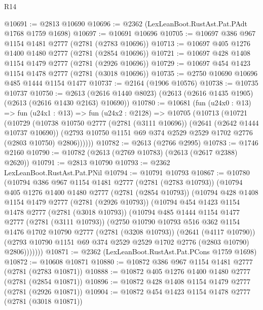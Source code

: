 \begin{lexlean}{R14}
\begin{coremodule}
@10691 := @2813 @10690
@10696 := @2362 (LexLeanBoot.RustAst.Pat.PAdt @1768 @1759 @1698)
@10697 := @10691 @10696
@10705 := @10697 @386 @967 @1154 @1481 @2777 (@2781 (@2783 @10696))
@10713 := @10697 @405 @1276 @1400 @1480 @2777 (@2781 (@2854 @10696))
@10721 := @10697 @428 @1408 @1154 @1479 @2777 (@2781 (@2926 @10696))
@10729 := @10697 @454 @1423 @1154 @1478 @2777 (@2781 (@3018 @10696))
@10735 := @2750 @10690 @10696 @485 @1444 @1154 @1477
@10737 := @2164 (@1906 @10576)
@10738 := @10735 @10737
@10750 := @2613 (@2616 @1440 @8023) (@2613 (@2616 @1435 @1905) (@2613 (@2616 @1430 @2163) @10690))
@10780 := @10681
    (fun (u24x0 : @13) =>
    fun (u24x1 : @13) =>
    fun (u24x2 : @2128) =>
    @10705
      (@10713
        (@10721
          (@10729
            (@10738
              @10750
              @2777
              (@2781 (@3111 @10696))
              (@2641 (@2642 @1444 @10737 @10690))
              (@2793 @10750 @1151 @69 @374 @2529 @2529 @1702 @2776 (@2803 @10750) @2806))))))
@10782 := @2613 (@2766 @2995)
@10783 := @1746 @2160
@10790 := @10782 (@2613 (@2769 @10783) (@2613 (@2617 @2388) @2620))
@10791 := @2813 @10790
@10793 := @2362 LexLeanBoot.RustAst.Pat.PNil
@10794 := @10791 @10793
@10867 := @10780
    (@10794
      @386
      @967
      @1154
      @1481
      @2777
      (@2781 (@2783 @10793))
      (@10794
        @405
        @1276
        @1400
        @1480
        @2777
        (@2781 (@2854 @10793))
        (@10794
          @428
          @1408
          @1154
          @1479
          @2777
          (@2781 (@2926 @10793))
          (@10794
            @454
            @1423
            @1154
            @1478
            @2777
            (@2781 (@3018 @10793))
            (@10794
              @485
              @1444
              @1154
              @1477
              @2777
              (@2781 (@3111 @10793))
              (@2750
                @10790
                @10793
                @516
                @362
                @1154
                @1476
                @1702
                @10790
                @2777
                (@2781 (@3208 @10793))
                (@2641 (@4117 @10790))
                (@2793 @10790 @1151 @69 @374 @2529 @2529 @1702 @2776 (@2803 @10790) @2806)))))))
@10871 := @2362 (LexLeanBoot.RustAst.Pat.PCons @1759 @1698)
@10872 := @10608 @10871
@10880 := @10872 @386 @967 @1154 @1481 @2777 (@2781 (@2783 @10871))
@10888 := @10872 @405 @1276 @1400 @1480 @2777 (@2781 (@2854 @10871))
@10896 := @10872 @428 @1408 @1154 @1479 @2777 (@2781 (@2926 @10871))
@10904 := @10872 @454 @1423 @1154 @1478 @2777 (@2781 (@3018 @10871))

\end{coremodule}
\end{lexlean}
